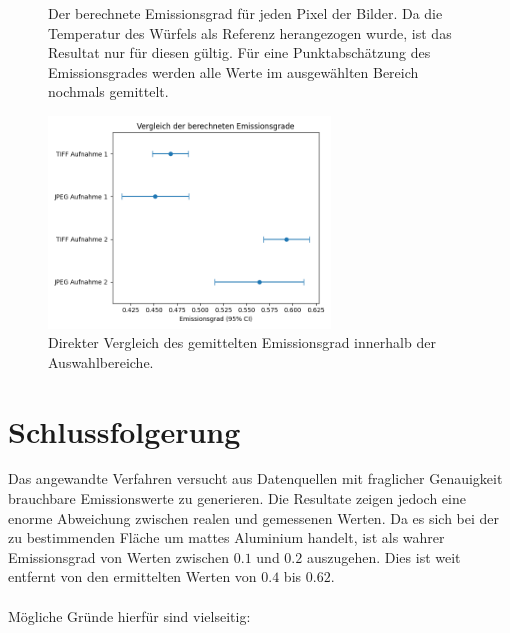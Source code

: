 \documentclass{article}
\begin{document}
\begin{figure}[H]
    \caption{
        Der berechnete Emissionsgrad für jeden Pixel der Bilder.
        Da die Temperatur des Würfels als Referenz herangezogen wurde, ist das Resultat nur für diesen gültig.
        Für eine Punktabschätzung des Emissionsgrades werden alle Werte im ausgewählten Bereich nochmals gemittelt.
    }
\end{figure}

\begin{figure}[H]
    \centering
    \captionsetup{width=7cm}
    \includegraphics[width=7.5cm]{img/eps_comp.png}
    \caption{
        Direkter Vergleich des gemittelten Emissionsgrad innerhalb der Auswahlbereiche.
    }
\end{figure}


\section{Schlussfolgerung}
Das angewandte Verfahren versucht aus Datenquellen mit fraglicher Genauigkeit brauchbare Emissionswerte zu generieren.
Die Resultate zeigen jedoch eine enorme Abweichung zwischen realen und gemessenen Werten.
Da es sich bei der zu bestimmenden Fläche um mattes Aluminium handelt, ist als wahrer Emissionsgrad von Werten zwischen $0.1$ und $0.2$ auszugehen.
Dies ist weit entfernt von den ermittelten Werten von $0.4$ bis $0.62$.
\\
\\
Mögliche Gründe hierfür sind vielseitig:
\end{document}
